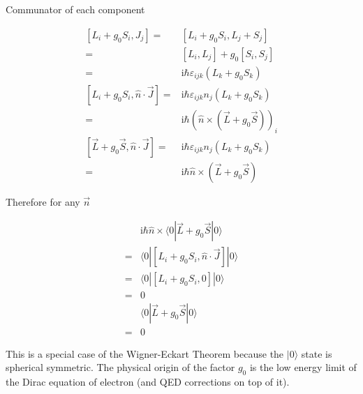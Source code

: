 \documentclass[10pt,fleqn]{article}
\newcommand{\ui}{\mathrm{i}}
\newcommand{\eqar}[1]
{
  \begin{align*}
    #1
  \end{align*}
}
\newcommand{\paren}[1]{{\left({#1}\right)}}
\newcommand{\sqr}[1]{{\left[{#1}\right]}}
\begin{document}
\section{}
\subsection{}
Communator of each component
\eqar{
  \sqr{L_i+g_0S_i,J_j}=&\sqr{L_i+g_0S_i,L_j+S_j}\\
  =&\sqr{L_i,L_j}+g_0\sqr{S_i,S_j}\\
  =&\ui\hbar\varepsilon_{ijk}\paren{L_k+g_0S_k}\\
  \sqr{L_i+g_0S_i,\hat n\cdot\vec J}=&\ui\hbar\varepsilon_{ijk}n_j\paren{L_k+g_0S_k}\\
  =&\ui\hbar \paren{\hat n\times\paren{\vec L+g_0\vec S}}_i\\
  \sqr{\vec L+g_0\vec S,\hat n\cdot\vec J}=&\ui\hbar\varepsilon_{ijk}n_j\paren{L_k+g_0S_k}\\
  =&\ui\hbar\hat n\times\paren{\vec L+g_0\vec S}
}
Therefore for any $\vec n$
\eqar{
  &\ui\hbar\hat n\times\langle 0|\vec L+g_0\vec S|0\rangle\\
  =&\langle 0|\sqr{L_i+g_0S_i,\hat n\cdot\vec J}|0\rangle\\
  =&\langle 0|\sqr{L_i+g_0S_i,0}|0\rangle\\
  =&0\\
  &\langle 0|\vec L+g_0\vec S|0\rangle\\
  =&0
}
This is a special case of the Wigner-Eckart Theorem because the $|0\rangle$ state
is spherical symmetric. The physical origin of the factor $g_0$ is the low energy
limit of the Dirac equation of electron (and QED corrections on top of it).
\subsection{}
\section{}
\section{}
\end{document}
